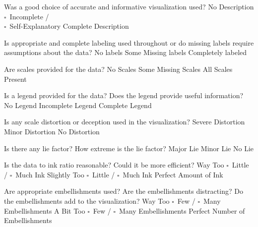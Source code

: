 \documentclass[a4paper,12pt]{article}
\begin{document}
	{Was a good choice of accurate and informative visualization used?}
	{\choice No Description}
	{$\square$~Incomplete /\\$\square$~Self-Explanatory}
	{\choice Complete Description}

%        

\EndTable  


\vspace{15pt}

   	{Is appropriate and complete labeling used throughout or do 
      	missing labels require assumptions about the data?}
    {\choice No labels}
    {\choice Some Missing labels}
    {\choice Completely labeled} 
        
   	{Are scales provided for the data?}
	{\choice No Scales}
	{\choice Some Missing Scales}
	{\choice All Scales Present} 

	{Is a legend provided for the data? Does the legend provide useful 
    	information?}
	{\choice No Legend}
	{\choice Incomplete Legend}
	{\choice Complete Legend} 
        
        
	{Is any scale distortion or deception used in the visualization?}	
	{\choice Severe Distortion}
	{\choice Minor Distortion}
	{\choice No Distortion} 

	{Is there any lie factor? How extreme is the lie factor?}
	{\choice Major Lie}
	{\choice Minor Lie}
	{\choice No Lie} 

	{Is the data to ink ratio reasonable? Could it be more efficient?}
	{Way Too $\square$~Little / $\square$~Much Ink}
	{Slightly Too $\square$~Little / $\square$~Much Ink}
	{\choice Perfect Amount of Ink} 
       
\EndTable  
        


	{Are appropriate embellishments used? Are the embellishments 
    	distracting? Do the embellishments add to the visualization?}
	{Way Too $\square$~Few / $\square$~Many Embellishments}
	{A Bit Too $\square$~Few / $\square$~Many Embellishments}
	{\choice Perfect Number of Embellishments} 
        
\end{document}
